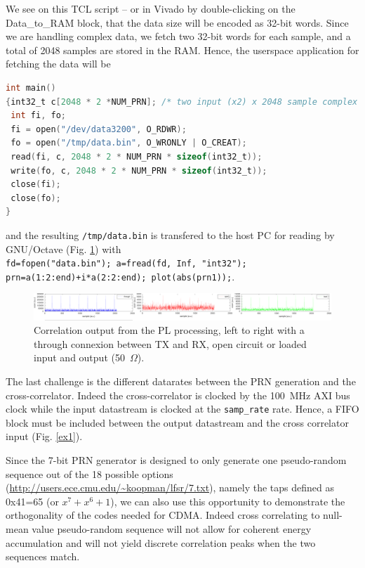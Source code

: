 \documentclass{article}
\begin{document}
We see on this TCL script -- or in Vivado by double-clicking on the Data\_to\_RAM block, that the
data size will be encoded as 32-bit words. Since we are handling complex data, we fetch two 32-bit 
words for each sample, and a total of 2048 samples are stored in the RAM. Hence, the userspace
application for fetching the data will be
\begin{lstlisting}[language=C]
int main()
{int32_t c[2048 * 2 *NUM_PRN]; /* two input (x2) x 2048 sample complex (x2) */
 int fi, fo;
 fi = open("/dev/data3200", O_RDWR);
 fo = open("/tmp/data.bin", O_WRONLY | O_CREAT);
 read(fi, c, 2048 * 2 * NUM_PRN * sizeof(int32_t));
 write(fo, c, 2048 * 2 * NUM_PRN * sizeof(int32_t));
 close(fi);
 close(fo);
}
\end{lstlisting}
and the resulting {\tt /tmp/data.bin} is transfered to the host PC for reading by GNU/Octave (Fig. \ref{res1})
with \\{\tt fd=fopen("data.bin"); a=fread(fd, Inf, "int32"); prn=a(1:2:end)+i*a(2:2:end); plot(abs(prn1));}.

\begin{figure}[h!tb]
\includegraphics[width=\linewidth]{results/example1.pdf}
\caption{Correlation output from the PL processing, left to right with a through connexion
between TX and RX, open circuit or loaded input and output (50~$\Omega$).}
\label{res1}
\end{figure}

The last challenge is the different datarates between the PRN generation and the cross-correlator.
Indeed the cross-correlator is clocked by the 100~MHz AXI bus clock while the input datastream
is clocked at the {\tt samp\_rate} rate. Hence, a FIFO block must be included between the 
output datastream and the cross correlator input (Fig. \ref{ex1}).

Since the 7-bit PRN generator is designed to only generate one pseudo-random sequence out of the 
18 possible options (\url{http://users.ece.cmu.edu/~koopman/lfsr/7.txt}), namely the taps defined 
as 0x41=65 (or $x^7+x^6+1$), we can also use this opportunity to demonstrate the orthogonality of 
the codes needed for CDMA. Indeed cross correlating to null-mean value pseudo-random sequence will 
not allow for coherent energy accumulation and will not yield discrete correlation peaks when 
the two sequences match.
\end{document}
